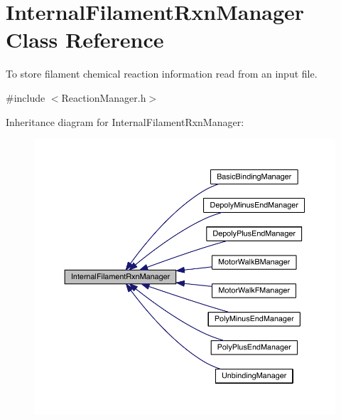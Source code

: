 \hypertarget{classInternalFilamentRxnManager}{\section{Internal\+Filament\+Rxn\+Manager Class Reference}
\label{classInternalFilamentRxnManager}
}


To store filament chemical reaction information read from an input file.  




{\ttfamily \#include $<$Reaction\+Manager.\+h$>$}



Inheritance diagram for Internal\+Filament\+Rxn\+Manager\+:\nopagebreak
\begin{figure}[H]
\begin{center}
\leavevmode
\includegraphics[width=350pt]{classInternalFilamentRxnManager__inherit__graph}
\end{center}
\end{figure}



